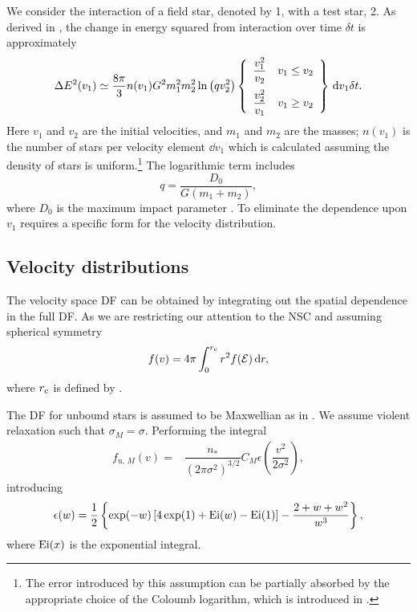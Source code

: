 We consider the interaction of a field star, denoted by 1, with a test star, 2. As derived in , the change in energy squared from interaction over time $\delta t$ is approximately \citep[chapter 2]{Chandrasekhar1960}
\begin{equation}
\Delta E^2(v_1) \simeq \dfrac{8\pi}{3} n(v_1)G^2m_1^2 m_2^2\ln\left(qv_2^2\right)\left\{\begin{array}{lr}\dfrac{v_1^2}{v_2}\vspace{2mm} & v_1 \leq v_2\\ \dfrac{v_2^2}{v_1} & v_1 \geq v_2 \end{array}\right\}\,\dd v_1\delta t.
\end{equation}
Here $v_1$ and $v_2$ are the initial velocities, and $m_1$ and $m_2$ are the masses; $n(v_1)$ is the number of stars per velocity element $\dd v_1$ which is calculated assuming the density of stars is uniform.\footnote{The error introduced by this assumption can be partially absorbed by the appropriate choice of the Coloumb logarithm, which is introduced in  \citep{Just2011}.} The logarithmic term includes
\begin{equation}
q = \dfrac{D_0}{G\left(m_1+m_2\right)},
\end{equation}
where $D_0$ is the maximum impact parameter \citep{Weinberg1986}. To eliminate the dependence upon $v_1$ requires a specific form for the velocity distribution.

\subsection{Velocity distributions}

The velocity space DF can be obtained by integrating out the spatial dependence in the full DF. As we are restricting our attention to the NSC and assuming spherical symmetry
\begin{equation}
f(v) = 4\pi\int_{0}^{r_\mathrm{c}}{r^2f(\mathcal{E})}\,\mathrm{d}{r},
\end{equation}
where $r_\mathrm{c}$ is defined by .

The DF for unbound stars is assumed to be Maxwellian as in . We assume violent relaxation such that $\sigma_M = \sigma$. Performing the integral
\begin{align}
f_{\mathrm{u},\,M}(v) = {} & \dfrac{n_\ast}{\left(2\pi\sigma^2\right)^{3/2}}C_M\epsilon\left(\dfrac{v^2}{2\sigma^2}\right),
\end{align}
introducing
\begin{equation}
\epsilon(w) = \dfrac{1}{2}\left\{\exp(-w)\left[4\exp(1) + \operatorname{Ei}(w) - \operatorname{Ei}(1)\right] - \dfrac{2 + w + w^2}{w^3}\right\},
\end{equation}
where $\operatorname{Ei}(x)$ is the exponential integral.

